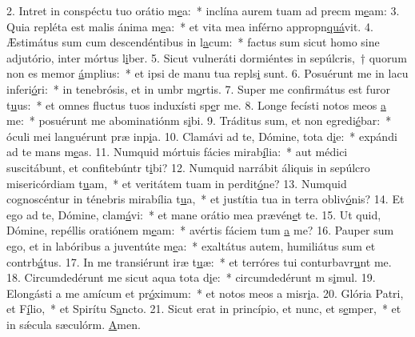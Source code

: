 2. Intret in conspéctu tuo orátio m\uline{e}a:~* inclína aurem tuam ad precm m\uline{e}am:
3. Quia repléta est malis ánima m\uline{e}a:~* et vita mea inférno appropn\uline{quá}vit.
4. Æstimátus sum cum descendéntibus in l\uline{a}cum:~* factus sum sicut homo sine adjutório, inter mórtus l\uline{i}ber.
5. Sicut vulneráti dormiéntes in sepúlcris,~† quorum non es memor \uline{á}mplius:~* et ipsi de manu tua repls\uline{i} sunt.
6. Posuérunt me in lacu inferi\uline{ó}ri:~* in tenebrósis, et in umbr m\uline{o}rtis.
7. Super me confirmátus est furor t\uline{u}us:~* et omnes fluctus tuos induxísti sp\uline{e}r me.
8. Longe fecísti notos meos \uline{a} me:~* posuérunt me abominatiónm s\uline{i}bi.
9. Tráditus sum, et non egredi\uline{é}bar:~* óculi mei languérunt præ inp\uline{i}a.
10. Clamávi ad te, Dómine, tota d\uline{i}e:~* expándi ad te mans m\uline{e}as.
11. Numquid mórtuis fácies mirab\uline{í}lia:~* aut médici suscitábunt, et confitebúntr t\uline{i}bi?
12. Numquid narrábit áliquis in sepúlcro misericórdiam t\uline{u}am,~* et veritátem tuam in perdit\uline{ó}ne?
13. Numquid cognoscéntur in ténebris mirabília t\uline{u}a,~* et justítia tua in terra obliv\uline{ó}nis?
14. Et ego ad te, Dómine, clam\uline{á}vi:~* et mane orátio mea prævén\uline{e}t te.
15. Ut quid, Dómine, repéllis oratiónem m\uline{e}am:~* avértis fáciem tum \uline{a} me?
16. Pauper sum ego, et in labóribus a juventúte m\uline{e}a:~* exaltátus autem, humiliátus sum et contrb\uline{á}tus.
17. In me transiérunt iræ t\uline{u}æ:~* et terróres tui conturbavr\uline{u}nt me.
18. Circumdedérunt me sicut aqua tota d\uline{i}e:~* circumdedérunt m s\uline{i}mul.
19. Elongásti a me amícum et pr\uline{ó}ximum:~* et notos meos a misr\uline{i}a.
20. Glória Patri, et F\uline{í}lio,~* et Spirítu S\uline{a}ncto.
21. Sicut erat in princípio, et nunc, et s\uline{e}mper,~* et in sǽcula sæculórm. \uline{A}men.
